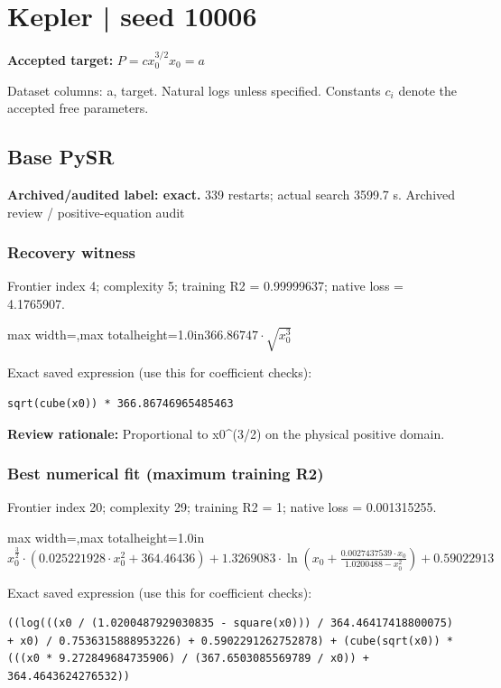\documentclass[10pt,letterpaper,landscape]{article}
\begin{document}
\section*{Kepler | seed 10006}
\textbf{Accepted target:} $\displaystyle P=c x_0^{3/2}$\hfill $x_0=a$\par
{\small Dataset columns: a, target. Natural logs unless specified. Constants $c_i$ denote the accepted free parameters.}\par\medskip
\begin{minipage}[t]{0.485\textwidth}
\subsection*{Base PySR}
\textbf{Archived/audited label: exact.} 339 restarts; actual search 3599.7 s.
{\small Archived review / positive-equation audit}
\subsubsection*{Recovery witness}
Frontier index 4; complexity 5; training R2 = 0.99999637; native loss = 4.1765907.
\begin{center}\begin{adjustbox}{max width=\linewidth,max totalheight=1.0in}$\displaystyle 366.86747 \cdot \sqrt{x_{0}^{3}}$\end{adjustbox}\end{center}
{\scriptsize Exact saved expression (use this for coefficient checks):}
\begin{lstlisting}
sqrt(cube(x0)) * 366.86746965485463
\end{lstlisting}
{\small\textbf{Review rationale:} Proportional to x0\textasciicircum{}(3/2) on the physical positive domain.}
\subsubsection*{Best numerical fit (maximum training R2)}
Frontier index 20; complexity 29; training R2 = 1; native loss = 0.001315255.
\begin{center}\begin{adjustbox}{max width=\linewidth,max totalheight=1.0in}$\displaystyle x_{0}^{\frac{3}{2}} \cdot \left(0.025221928 \cdot x_{0}^{2} + 364.46436\right) + 1.3269083 \cdot \ln{\left(x_{0} + \frac{0.0027437539 \cdot x_{0}}{1.0200488 - x_{0}^{2}} \right)} + 0.59022913$\end{adjustbox}\end{center}
{\scriptsize Exact saved expression (use this for coefficient checks):}
\begin{lstlisting}
((log(((x0 / (1.0200487929030835 - square(x0))) / 364.46417418800075) + x0) / 0.7536315888953226) + 0.5902291262752878) + (cube(sqrt(x0)) * (((x0 * 9.272849684735906) / (367.6503085569789 / x0)) + 364.4643624276532))
\end{lstlisting}
\end{minipage}\hfill
\end{document}
